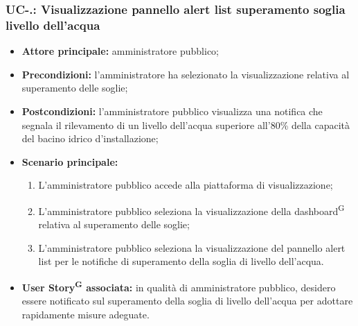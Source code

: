 \documentclass[8pt]{article}
\newcommand{\glossterm}[1]{#1\textsuperscript{G}} %
\begin{document}
\subsubsection*{UC-\theuc .\speconenumber: Visualizzazione pannello alert list superamento soglia livello dell'acqua}
\begin{itemize}
    \item \textbf{Attore principale:} amministratore pubblico;
    \item \textbf{Precondizioni:} l'amministratore ha selezionato la visualizzazione relativa al superamento delle soglie;
    \item \textbf{Postcondizioni:} l’amministratore pubblico visualizza una notifica che segnala il rilevamento di un livello dell'acqua superiore all'80\% della capacità del bacino idrico d'installazione;
    \item \textbf{Scenario principale:}
        \begin{enumerate}
        \item L’amministratore pubblico accede alla piattaforma di visualizzazione;
        \item L’amministratore pubblico seleziona la visualizzazione della \glossterm{dashboard} relativa al superamento delle soglie;
        \item L'amministratore pubblico seleziona la visualizzazione del pannello alert list per le notifiche di superamento della soglia di livello dell'acqua.
        \end{enumerate}
    \item \textbf{\glossterm{User Story} associata:} in qualità di amministratore pubblico, desidero essere notificato sul superamento della soglia di livello dell'acqua per adottare rapidamente misure adeguate.
\end{itemize}
\end{document}
